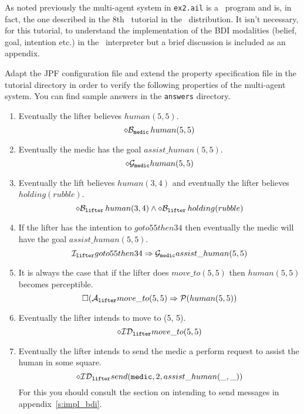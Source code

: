 As noted previously the multi-agent system in \texttt{ex2.ail} is a \gwendolen\ program and is, in fact, the one described in the 8th \gwendolen\ tutorial in the \mcapl\ distribution.  It isn't necessary, for this tutorial, to understand the implementation of the BDI modalities (belief, goal, intention etc.) in the \gwendolen\ interpreter but a brief discussion is included as an appendix.

Adapt the JPF configuration file and extend the property specification file in the tutorial directory in order to verify the following properties of the multi-agent system.  You can find sample answers in the \texttt{answers} directory.

\begin{enumerate}
\item Eventually the lifter believes $human(5, 5)$.
$$\diamond \mathrm{{\cal B}}_{\texttt{medic}} \, human(5, 5)$$
\item Eventually the medic has the goal $assist\_human(5, 5)$.
$$\diamond \mathrm{{\cal G}}_{\texttt{medic}} human(5, 5)$$
\item Eventually the lift believes $human(3, 4)$ and eventually the lifter believes $holding(rubble)$.
$$\diamond \mathrm{{\cal B}}_{\texttt{lifter}} \, human(3, 4) \wedge \diamond \mathrm{{\cal B}}_{\texttt{lifter}} \, holding(rubble)$$
\item If the lifter has the intention to $goto55then34$ then eventually the medic will have the goal $assist\_human(5, 5)$. 
$$\mathrm{{\cal I}}_{\texttt{lifter}} goto55then34 \Rightarrow \mathrm{{\cal G}}_{\texttt{medic}} assist\_human(5, 5)$$
\item It is always the case that if the lifter does $move\_to(5, 5)$ then $human(5, 5)$ becomes perceptible.  
$$\Box (\mathrm{{\cal A}}_{\texttt{lifter}} move\_to(5, 5) \Rightarrow \mathrm{{\cal P}}(human(5, 5))$$
\item Eventually the lifter intends to move to (5, 5).
$$\diamond \mathrm{{\cal ID}}_{\texttt{lifter}} move\_to(5, 5)$$
\item Eventually the lifter intends to send the medic a perform request to assist the human in some square.
$$\diamond \mathrm{{\cal ID}}_{\texttt{lifter}} send(\texttt{medic}, 2, assist\_human(\_, \_))$$
For this you should consult the section on intending to send messages in appendix~\ref{s:impl_bdi}.
\end{enumerate}


